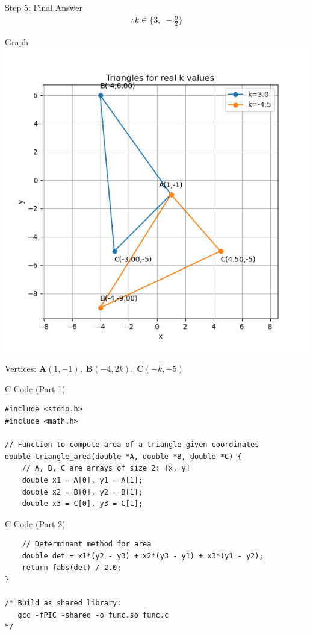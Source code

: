 \documentclass{beamer}
\begin{document}
\begin{frame}{Step 5: Final Answer}
\begin{align}
\therefore k \in \{3,\; -\tfrac{9}{2}\}
\end{align}


\end{frame}

\begin{frame}{Graph}
\centering
\includegraphics[width=0.75\linewidth]{./figs/triangle_area.png}

\bigskip
Vertices: 
$\boldsymbol{A}(1,-1),\;
 \boldsymbol{B}(-4,2k),\;
 \boldsymbol{C}(-k,-5)$
\end{frame}


\begin{frame}[fragile]{C Code (Part 1)}
\begin{lstlisting}
#include <stdio.h>
#include <math.h>

// Function to compute area of a triangle given coordinates
double triangle_area(double *A, double *B, double *C) {
    // A, B, C are arrays of size 2: [x, y]
    double x1 = A[0], y1 = A[1];
    double x2 = B[0], y2 = B[1];
    double x3 = C[0], y3 = C[1];
\end{lstlisting}
\end{frame}

\begin{frame}[fragile]{C Code (Part 2)}
\begin{lstlisting}
    // Determinant method for area
    double det = x1*(y2 - y3) + x2*(y3 - y1) + x3*(y1 - y2);
    return fabs(det) / 2.0;
}

/* Build as shared library:
   gcc -fPIC -shared -o func.so func.c
*/
\end{lstlisting}
\end{frame}
\end{document}
